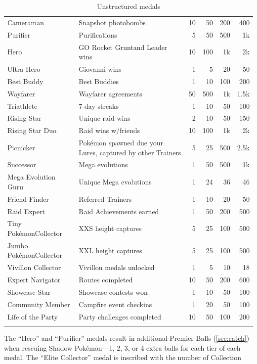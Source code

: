 \begin{longtable}{m{}m{}rrrr}
Cameraman & Snapshot photobombs & 10 & 50 & 200 & 400\\
Purifier & Purifications & 5 & 50 & 500 & 1k\\
Hero & GO Rocket Grunt\newline{}and Leader wins & 10 & 100 & 1k & 2k\\
Ultra Hero & Giovanni wins & 1 & 5 & 20 & 50\\
Best Buddy & Best Buddies & 1 & 10 & 100 & 200\\
Wayfarer & Wayfarer agreements & 50 & 500 & 1k & 1.5k\\
Triathlete & 7-day streaks & 1 & 10 & 50 & 100\\
Rising Star & Unique raid wins & 2 & 10 & 50 & 150\\
Rising Star Duo & Raid wins w/friends & 10 & 100 & 1k & 2k\\
Picnicker & Pokémon spawned due your Lures, captured by other Trainers & 5 & 25 & 500 & 2.5k\\
Successor & Mega evolutions & 1 & 50 & 500 & 1k\\
Mega Evolution Guru & Unique Mega evolutions & 1 & 24 & 36 & 46\\
Friend Finder & Referred Trainers & 1 & 10 & 20 & 50\\
Raid Expert & Raid Achievements earned & 1 & 50 & 200 & 500\\
Tiny Pokémon\newline{}Collector & XXS height captures & 5 & 25 & 100 & 500\\
Jumbo Pokémon\newline{}Collector & XXL height captures & 5 & 25 & 100 & 500\\
Vivillon Collector & Vivillon medals unlocked & 1 & 5 & 10 & 18\\
Expert Navigator & Routes completed & 10 & 50 & 200 & 600\\
Showcase Star & Showcase contests won & 1 & 10 & 50 & 100\\
Community Member & Campfire event checkins & 1 & 20 & 50 & 100\\
Life of the Party & Party challenges completed & 10 & 50 & 100 & 200\\
\caption{Unstructured medals}
\label{table:medals}
\end{longtable}
\endgroup
The ``Hero'' and ``Purifier'' medals result in additional Premier Balls (\autoref{sec:catch})
  when rescuing Shadow Pokémon---1, 2, 3, or 4 extra balls for each tier of each medal.
The ``Elite Collector'' medal is inscribed with the number of Collection
